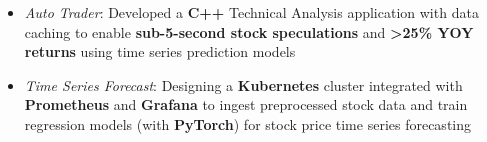 \begin{itemize}
  \item \textit{Auto Trader}: Developed a \textbf{C++} Technical Analysis application with data caching to enable \textbf{sub-5-second stock speculations} and \textbf{\textgreater{}25\% YOY returns} using time series prediction models
  \item \textit{Time Series Forecast}: Designing a \textbf{Kubernetes} cluster integrated with \textbf{Prometheus} and \textbf{Grafana} to ingest preprocessed stock data and train regression models (with \textbf{PyTorch}) for stock price time series forecasting
\end{itemize}